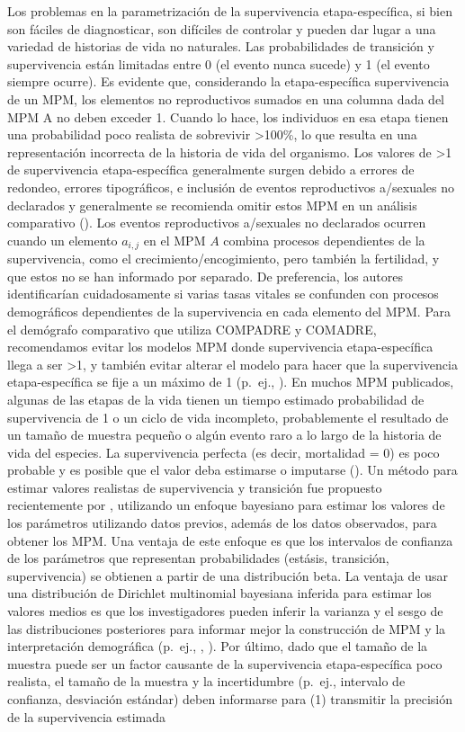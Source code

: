 \documentclass[
]{book}
\theoremstyle{definition}
\theoremstyle{definition}
\theoremstyle{definition}
\theoremstyle{definition}
\theoremstyle{remark}
\begin{document}
Los problemas en la parametrización de la supervivencia etapa-específica, si bien son fáciles de diagnosticar, son difíciles de controlar y pueden dar lugar a una variedad de historias de vida no naturales. Las probabilidades de transición y supervivencia están limitadas entre 0 (el evento nunca sucede) y 1 (el evento siempre ocurre). Es evidente que, considerando la etapa-específica supervivencia de un MPM, los elementos no reproductivos sumados en una columna dada del MPM A no deben exceder 1. Cuando lo hace, los individuos en esa etapa tienen una probabilidad poco realista de sobrevivir \textgreater100\%, lo que resulta en una representación incorrecta de la historia de vida del organismo. Los valores de \textgreater1 de supervivencia etapa-específica generalmente surgen debido a errores de redondeo, errores tipográficos, e inclusión de eventos reproductivos a/sexuales no declarados y generalmente se recomienda omitir estos MPM en un análisis comparativo (\citet{jones2014diversity}). Los eventos reproductivos a/sexuales no declarados ocurren cuando un elemento \(a_{i,j}\) en el MPM \(A\) combina procesos dependientes de la supervivencia, como el crecimiento/encogimiento, pero también la fertilidad, y que estos no se han informado por separado. De preferencia, los autores identificarían cuidadosamente si varias tasas vitales se confunden con procesos demográficos dependientes de la supervivencia en cada elemento del MPM. Para el demógrafo comparativo que utiliza COMPADRE y COMADRE, recomendamos evitar los modelos MPM donde supervivencia etapa-específica llega a ser \textgreater1, y también evitar alterar el modelo para hacer que la supervivencia etapa-específica se fije a un máximo de 1 (p.~ej., \citet{buckley2010causes}). En muchos MPM publicados, algunas de las etapas de la vida tienen un tiempo estimado probabilidad de supervivencia de 1 o un ciclo de vida incompleto, probablemente el resultado de un tamaño de muestra pequeño o algún evento raro a lo largo de la historia de vida del especies. La supervivencia perfecta (es decir, mortalidad = 0) es poco probable y es posible que el valor deba estimarse o imputarse (\citet{johnson2018climate}). Un método para estimar valores realistas de supervivencia y transición fue propuesto recientemente por \citet{tremblay2021population}, utilizando un enfoque bayesiano para estimar los valores de los parámetros utilizando datos previos, además de los datos observados, para obtener los MPM. Una ventaja de este enfoque es que los intervalos de confianza de los parámetros que representan probabilidades (estásis, transición, supervivencia) se obtienen a partir de una distribución beta. La ventaja de usar una distribución de Dirichlet multinomial bayesiana inferida para estimar los valores medios es que los investigadores pueden inferir la varianza y el sesgo de las distribuciones posteriores para informar mejor la construcción de MPM y la interpretación demográfica (p.~ej., \citet{tremblay2009dormancy}, \citet{tremblay2009population}). Por último, dado que el tamaño de la muestra puede ser un factor causante de la supervivencia etapa-específica poco realista, el tamaño de la muestra y la incertidumbre (p.~ej., intervalo de confianza, desviación estándar) deben informarse para (1) transmitir la precisión de la supervivencia estimada 
\end{document}
